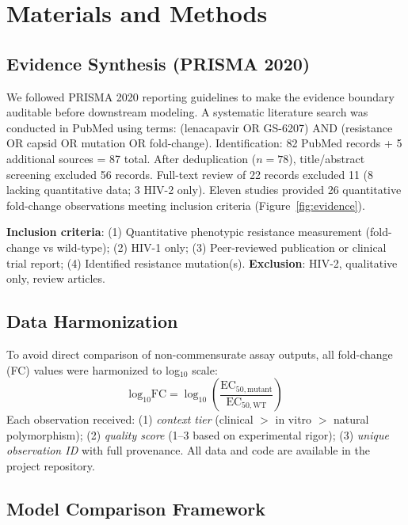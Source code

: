 \documentclass[preprint]{elsarticle}
\begin{document}
\section{Materials and Methods}

\subsection{Evidence Synthesis (PRISMA 2020)}

We followed PRISMA 2020 reporting guidelines \cite{Page2021} to make the evidence boundary auditable before downstream modeling. A systematic literature search was conducted in PubMed using terms: (lenacapavir OR GS-6207) AND (resistance OR capsid OR mutation OR fold-change). Identification: 82 PubMed records + 5 additional sources = 87 total. After deduplication ($n=78$), title/abstract screening excluded 56 records. Full-text review of 22 records excluded 11 (8 lacking quantitative data; 3 HIV-2 only). Eleven studies provided 26 quantitative fold-change observations meeting inclusion criteria (Figure~\ref{fig:evidence}).

\textbf{Inclusion criteria}: (1) Quantitative phenotypic resistance measurement (fold-change vs wild-type); (2) HIV-1 only; (3) Peer-reviewed publication or clinical trial report; (4) Identified resistance mutation(s). \textbf{Exclusion}: HIV-2, qualitative only, review articles.

\subsection{Data Harmonization}

To avoid direct comparison of non-commensurate assay outputs, all fold-change (FC) values were harmonized to log$_{10}$ scale:
\begin{equation}
\text{log}_{10}\text{FC} = \log_{10}\left(\frac{\text{EC}_{50,\text{mutant}}}{\text{EC}_{50,\text{WT}}}\right)
\end{equation}
Each observation received: (1) \textit{context tier} (clinical $>$ in vitro $>$ natural polymorphism); (2) \textit{quality score} (1--3 based on experimental rigor); (3) \textit{unique observation ID} with full provenance. All data and code are available in the project repository.

\subsection{Model Comparison Framework}
\end{document}
